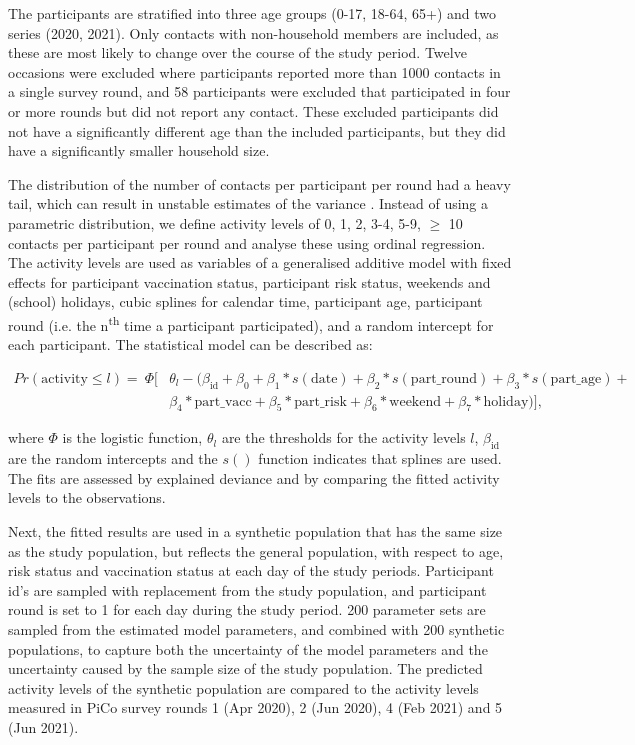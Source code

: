 \documentclass[fleqn,10pt]{wlscirep}
\begin{document}
The participants are stratified into three age groups (0-17, 18-64, 65+) and two series (2020, 2021). Only contacts with non-household members are included, as these are most likely to change over the course of the study period. Twelve occasions were excluded where participants reported more than 1000 contacts in a single survey round, and 58 participants were excluded that participated in four or more rounds but did not report any contact. These excluded participants did not have a significantly different age than the included participants, but they did have a significantly smaller household size.

The distribution of the number of contacts per participant per round had a heavy tail, which can result in unstable estimates of the variance \cite{Tagore_2015}. Instead of using a parametric distribution, we define activity levels of 0, 1, 2, 3-4, 5-9, $\geq$ 10 contacts per participant per round and analyse these using ordinal regression. The activity levels are used as variables of a generalised additive model with fixed effects for participant vaccination status, participant risk status, weekends and (school) holidays, cubic splines for calendar time, participant age, participant round (i.e. the n\textsuperscript{th} time a participant participated), and a random intercept for each participant. The statistical model can be described as:

\begin{align*}
Pr(\mathrm{activity} \leq l) = \: \Phi[ & \theta_l - (\beta_\mathrm{id} + \beta_0 + \beta_1 * s(\mathrm{date}) + \beta_2 * s(\mathrm{part\_round}) + \beta_3 * s(\mathrm{part\_age}) + \\
& \beta_4 * \mathrm{part\_vacc} + \beta_5 * \mathrm{part\_risk} + \beta_6 * \mathrm{weekend} + \beta_7 * \mathrm{holiday})],
\end{align*}

where $\Phi$ is the logistic function, $\theta_l$ are the thresholds for the activity levels $l$, $\beta_\mathrm{id}$ are the random intercepts and the $s()$ function indicates that splines are used. The fits are assessed by explained deviance and by comparing the fitted activity levels to the observations. 

Next, the fitted results are used in a synthetic population that has the same size as the study population, but reflects the general population, with respect to age\cite{CBS_2021}, risk status\cite{Nivel_2021} and vaccination status\cite{RIVM_2022} at each day of the study periods. Participant id's are sampled with replacement from the study population, and participant round is set to 1 for each day during the study period. 200 parameter sets are sampled from the estimated model parameters, and combined with 200 synthetic populations, to capture both the uncertainty of the model parameters and the uncertainty caused by the sample size of the study population. The predicted activity levels of the synthetic population are compared to the activity levels measured in PiCo survey rounds 1 (Apr 2020), 2 (Jun 2020), 4 (Feb 2021) and 5 (Jun 2021).
\end{document}
